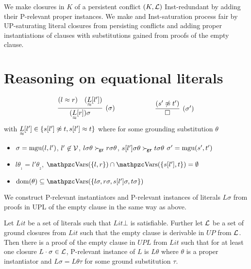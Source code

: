     We make closures in \( K \)
    of a persistent conflict \( (K,\mathcal{L}) \)
    Inst-redundant by adding their P-relevant proper instances.
    We make and Inst-saturation process fair
    by UP-saturating literal closures from persisting conflicts
    and adding proper instantiations of clauses with substitutions
    gained from proofs of the empty clause.


    \section{Reasoning on equational literals}\label{sec:reasoning:on:equational:literals}

    \begin{definition}\label{def:unit:superposition:on:literals}
        \begin{gather*}
            \infer[(\sigma)]
            {(\underset{\mEQ}{L}[r])\sigma}
            {(l\mEQ r) & (\underset{\mEQ}{L}[l'])}
        \qquad\qquad\qquad
            \infer[(\sigma')]
            {\emptyclause}
            {(s'\mNE t')}
        \end{gather*}
        with \( \underset{\approx}{L}[l'] \in \{ s[l']\not\approx t, s[l']\approx t \} \) where
        for some grounding substitution \( \theta \)
        \begin{itemize}
            \item
            \( \sigma = \operatorname{mgu}(l,l') \),
            \( l'\not\in\mathcal{V} \),
            \( l\sigma\theta \mathrel\succ_{\!\mathtt{gr}} r\sigma\theta \),
            \( s[l']\sigma\theta \mathrel\succ_{\!\mathtt{gr}} t\sigma\theta \)
            \hfill \( \sigma' = \operatorname{mgu}(s',t') \)
            \item
            \( l\theta_{\!_1} = l'\theta_{\!_2} \),
            \( \var(\{l,r\}) \cap \var(\{ s[l'],t \}) = \emptyset \)
            \item
            \( \domain(\theta) \subseteq \var(\{ l\sigma,r\sigma,s[l']\sigma,t\sigma \}) \)
        \end{itemize}
    \end{definition}

    We construct P-relevant instantiators and P-relevant instances
    of literals \( L\sigma \) from proofs in UPL of the empty clause
    in the same way as above.

    \begin{lemma}
        Let \(Lit\) be a set of literals such that \( Lit\bot \) is satisfiable.
        Further let \( \mathcal{L} \) be a set of ground closures from \( Lit \)
        such that the empty clause is derivable in \( UP \) from \( \mathcal{L} \).
        Then there is a proof of the empty clause in \( UPL \) from \( Lit \)
        such that for at least one closure \( L \cdot \sigma \in \mathcal{L} \),
        P-relevant instance of \(L\) is \( L\theta \)
        where \( \theta \) is a proper instantiator
        and \( L\sigma = L\theta\tau \) for some ground substitution \( \tau \).
    \end{lemma}

